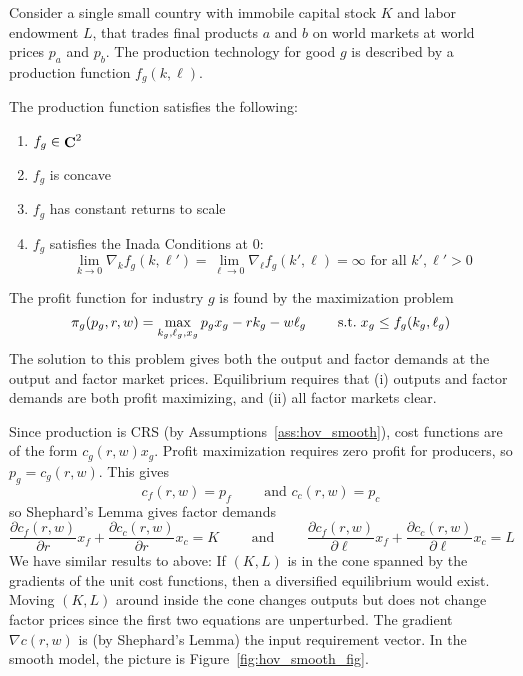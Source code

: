 \documentclass[10pt]{article}
\begin{document}
\begin{model}
	 Consider a single small country with immobile capital stock $K$ and labor endowment $L$, that trades final products $a$ and $b$ on world markets at world prices $p_a$ and $p_b$. The production technology for good $g$ is described by a production function $f_g(k,\ell)$. 
	
	\begin{assumption}\label{ass:hov_smooth}
		The production function satisfies the following:
		\begin{enumerate}
			\item $f_g \in \mathop{\bf C}^2$
			\item $f_g$ is concave
			\item $f_g$ has constant returns to scale
			\item $f_g$ satisfies the Inada Conditions at 0: \[\lim_{k\to0} \nabla_k f_g(k,\ell') = \lim_{\ell\to0} \nabla_\ell f_g(k',\ell) = \infty \text{ for all } k',\ell' > 0\]
		\end{enumerate}
	\end{assumption}
	The profit function for industry $g$ is found by the maximization problem \[\pi_g(p_g,r,w) = \max_{k_g,\ell_g,x_g}p_gx_g - rk_g - w\ell_g \qquad \;\text{s.t.}\; x_g \le f_g(k_g,\ell_g)\]
	The solution to this problem gives both the output and factor demands at the output and factor market prices. Equilibrium requires that (i) outputs and factor demands are both profit maximizing, and (ii) all factor markets clear.
	
	Since production is CRS (by Assumptions~\ref{ass:hov_smooth}), cost functions are of the form $c_g(r,w)x_g$. Profit maximization requires zero profit for producers, so $p_g = c_g(r,w)$. This gives \[c_f(r,w) = p_f \qquad \text{ and } c_c(r,w) = p_c\]so Shephard's Lemma gives factor demands\[\frac{\partial c_f(r,w)}{\partial r}x_f + \frac{\partial c_c(r,w)}{\partial r}x_c = K \qquad \text{ and } \qquad \frac{\partial c_f(r,w)}{\partial \ell}x_f + \frac{\partial c_c(r,w)}{\partial \ell}x_c = L\]We have similar results to above: If $(K,L)$ is in the cone spanned by the gradients of the unit cost functions, then a diversified equilibrium would exist. Moving $(K,L)$ around inside the cone changes outputs but does not change factor prices since the first two equations are unperturbed. The gradient $\nabla c(r,w)$ is (by Shephard's Lemma) the input requirement vector. In the smooth model, the picture is Figure~\ref{fig:hov_smooth_fig}.
	

\end{model}
\end{document}
